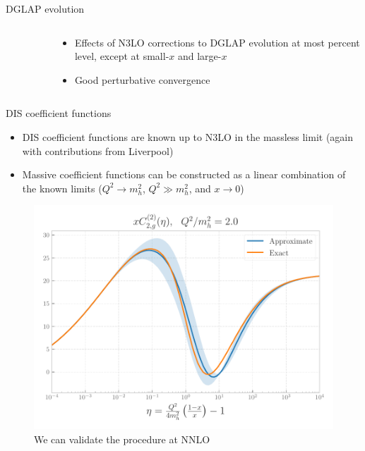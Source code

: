 \documentclass[aspectratio=169, 9pt,t]{beamer}
\begin{document}
\begin{frame}{DGLAP evolution}
\begin{columns}
\begin{column}{0.59\textwidth}
\begin{figure}[!t]
      \end{figure}
    \end{column}
    \begin{column}{0.39\textwidth}
      \begin{itemize}
        \item Effects of N3LO corrections to DGLAP evolution at most percent level, except at small-$x$ and large-$x$
        \item Good perturbative convergence
      \end{itemize}
    \end{column}
  \end{columns}
\end{frame}

\begin{frame}{DIS coefficient functions}
  \begin{itemize}
    \item DIS coefficient functions are known up to N3LO in the massless limit (again with contributions from Liverpool)
    \item Massive coefficient functions can be constructed as a linear combination of the known limits ($Q^2 \rightarrow m_h^2$, $Q^2\gg m_h^2$, and $x\rightarrow 0$)
  \end{itemize}

  \begin{figure}[!t]
    \centering
    \includegraphics[width=.4\textwidth]{figures/C2g_2_Q2m2_2.0.pdf}
    \caption*{We can validate the procedure at NNLO}
  \end{figure}
\end{frame}
\end{document}
